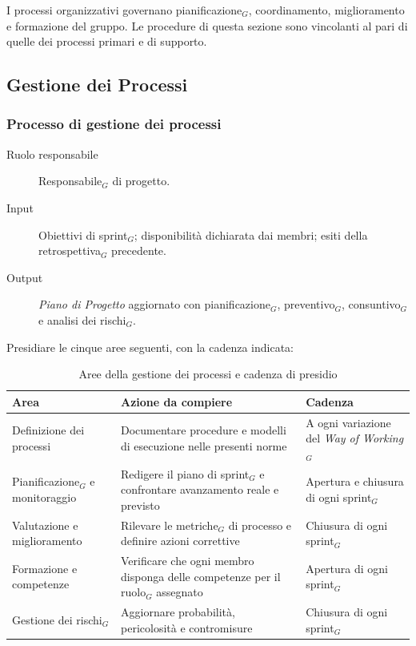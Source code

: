 \documentclass[a4paper, 10pt]{article}
\renewcommand{\arraystretch}{1.2}
\begin{document}
I processi organizzativi governano pianificazione$_G$, coordinamento, miglioramento e formazione del gruppo. Le procedure di questa sezione sono vincolanti al pari di quelle dei processi primari e di supporto.

\subsection{Gestione dei Processi}
\label{subsec:gestione_processi}

\subsubsection{Processo di gestione dei processi}
\label{subsubsec:processo_gestione}

\begin{description}
    \item[Ruolo responsabile] Responsabile$_G$ di progetto.
    \item[Input] Obiettivi di sprint$_G$; disponibilità dichiarata dai membri; esiti della retrospettiva$_G$ precedente.
    \item[Output] \emph{Piano di Progetto} aggiornato con pianificazione$_G$, preventivo$_G$, consuntivo$_G$ e analisi dei rischi$_G$.
\end{description}

\noindent Presidiare le cinque aree seguenti, con la cadenza indicata:

\begin{table}[H]
    \centering
    \renewcommand{\arraystretch}{1.3}
    \begin{tabularx}{\textwidth}{|l|L|l|}
        \hline
        \textbf{Area} & \textbf{Azione da compiere} & \textbf{Cadenza} \\
        \hline
        Definizione dei processi & Documentare procedure e modelli di esecuzione nelle presenti norme & A ogni variazione del \textit{Way of Working$_G$} \\ \hline
        Pianificazione$_G$ e monitoraggio & Redigere il piano di sprint$_G$ e confrontare avanzamento reale e previsto & Apertura e chiusura di ogni sprint$_G$ \\ \hline
        Valutazione e miglioramento & Rilevare le metriche$_G$ di processo e definire azioni correttive & Chiusura di ogni sprint$_G$ \\ \hline
        Formazione e competenze & Verificare che ogni membro disponga delle competenze per il ruolo$_G$ assegnato & Apertura di ogni sprint$_G$ \\ \hline
        Gestione dei rischi$_G$ & Aggiornare probabilità, pericolosità e contromisure & Chiusura di ogni sprint$_G$ \\ \hline
    \end{tabularx}
    \caption{Aree della gestione dei processi e cadenza di presidio}
\end{table}
\end{document}
